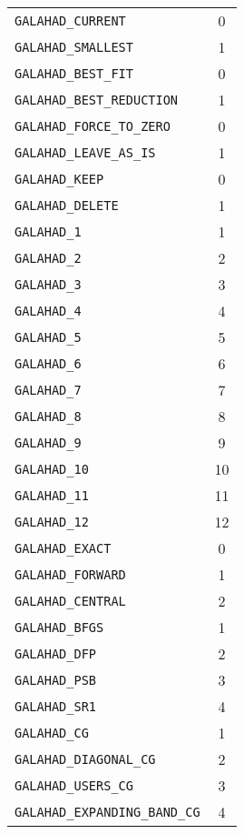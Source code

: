 \documentclass{galahad}
\begin{document}
\begin{figure}[htbf]
\begin{center}
\begin{tabular}{|l|c|}
\hline
{\tt GALAHAD\_CURRENT}              &  0 \\
{\tt GALAHAD\_SMALLEST}             &  1 \\
\hline
{\tt GALAHAD\_BEST\_FIT}            &  0 \\
{\tt GALAHAD\_BEST\_REDUCTION}      &  1 \\
\hline
{\tt GALAHAD\_FORCE\_TO\_ZERO}      &  0 \\
{\tt GALAHAD\_LEAVE\_AS\_IS}        &  1 \\
\hline
{\tt GALAHAD\_KEEP}                 &  0 \\
{\tt GALAHAD\_DELETE}               &  1 \\
\hline
{\tt GALAHAD\_1}                    &  1 \\
{\tt GALAHAD\_2}                    &  2 \\
{\tt GALAHAD\_3}                    &  3 \\
{\tt GALAHAD\_4}                    &  4 \\
{\tt GALAHAD\_5}                    &  5 \\
{\tt GALAHAD\_6}                    &  6 \\
{\tt GALAHAD\_7}                    &  7 \\
{\tt GALAHAD\_8}                    &  8 \\
{\tt GALAHAD\_9}                    &  9 \\
{\tt GALAHAD\_10}                   & 10 \\
{\tt GALAHAD\_11}                   & 11 \\
{\tt GALAHAD\_12    }               & 12 \\
\hline
{\tt GALAHAD\_EXACT}                &  0 \\
{\tt GALAHAD\_FORWARD}              &  1 \\
{\tt GALAHAD\_CENTRAL}              &  2 \\
\hline
{\tt GALAHAD\_BFGS}                 &  1 \\
{\tt GALAHAD\_DFP}                  &  2 \\
{\tt GALAHAD\_PSB}                  &  3 \\
{\tt GALAHAD\_SR1}                  &  4 \\
\hline
{\tt GALAHAD\_CG}                   &  1 \\
{\tt GALAHAD\_DIAGONAL\_CG}         &  2 \\
{\tt GALAHAD\_USERS\_CG}            &  3 \\
{\tt GALAHAD\_EXPANDING\_BAND\_CG}  &  4 \\

\end{tabular}
\end{center}
\end{figure}
\end{document}
